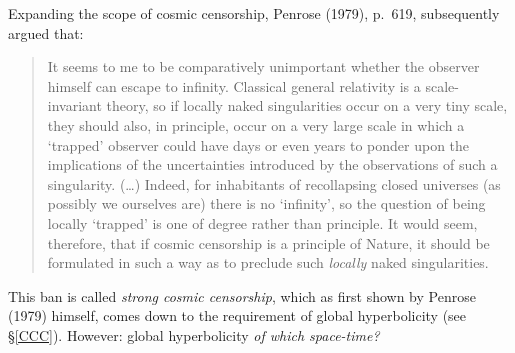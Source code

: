 \documentclass[12pt]{article}
\begin{document}
Expanding the scope of cosmic censorship, Penrose (1979), p.\ 619,  subsequently argued that:
  \begin{quote}
\begin{small}
It seems to me to be comparatively unimportant whether the observer himself can escape to infinity. Classical general relativity is a scale-invariant theory, so if locally naked singularities occur on a very tiny scale, they should also, in principle, occur on a very large scale in which a `trapped' observer could have days or even years to ponder upon the implications of the uncertainties introduced by the observations of such a singularity. (\ldots) Indeed, for inhabitants of recollapsing closed universes (as possibly we ourselves are) there is no `infinity', so the question of being locally `trapped' is one of degree rather than principle.  
It would seem, therefore, that if cosmic censorship is a principle of Nature, it should be formulated in such a way as to preclude such \emph{locally} naked singularities.
\end{small}
\end{quote} 
This ban is called \emph{strong cosmic censorship}, which as first shown by Penrose (1979) himself, comes down to the requirement of global hyperbolicity (see \S\ref{CCC}). However: global hyperbolicity \emph{of which space-time?}
\end{document}
